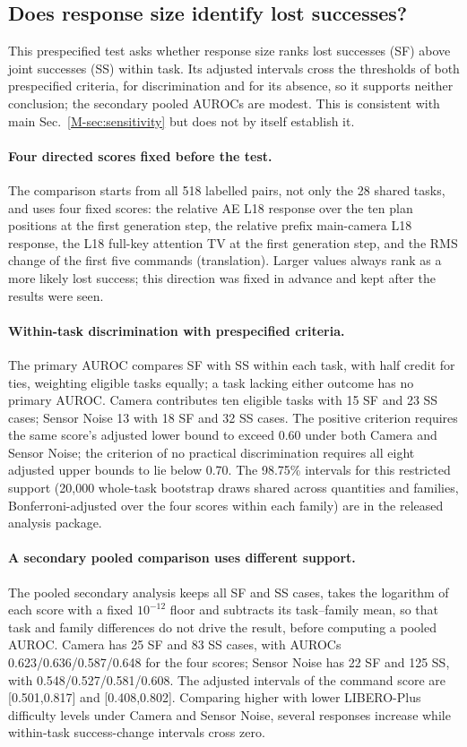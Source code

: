 \subsection{Does response size identify lost successes?}
\label{sec:plus-p0}
This prespecified test asks whether response size ranks lost successes (SF) above joint successes (SS) within task. Its adjusted intervals cross the thresholds of both prespecified criteria, for discrimination and for its absence, so it supports neither conclusion; the secondary pooled AUROCs are modest. This is consistent with main Sec.~\ref*{M-sec:sensitivity} but does not by itself establish it.

\paragraph{Four directed scores fixed before the test.}
The comparison starts from all 518 labelled pairs, not only the 28 shared tasks, and uses four fixed scores: the relative AE L18 response over the ten plan positions at the first generation step, the relative prefix main-camera L18 response, the L18 full-key attention TV at the first generation step, and the RMS change of the first five commands (translation). Larger values always rank as a more likely lost success; this direction was fixed in advance and kept after the results were seen.

\paragraph{Within-task discrimination with prespecified criteria.}
The primary AUROC compares SF with SS within each task, with half credit for ties, weighting eligible tasks equally; a task lacking either outcome has no primary AUROC. Camera contributes ten eligible tasks with 15 SF and 23 SS cases; Sensor Noise 13 with 18 SF and 32 SS cases. The positive criterion requires the same score's adjusted lower bound to exceed 0.60 under both Camera and Sensor Noise; the criterion of no practical discrimination requires all eight adjusted upper bounds to lie below 0.70. The 98.75\% intervals for this restricted support (20,000 whole-task bootstrap draws shared across quantities and families, Bonferroni-adjusted over the four scores within each family) are in the released analysis package.

\paragraph{A secondary pooled comparison uses different support.}
The pooled secondary analysis keeps all SF and SS cases, takes the logarithm of each score with a fixed $10^{-12}$ floor and subtracts its task--family mean, so that task and family differences do not drive the result, before computing a pooled AUROC. Camera has 25 SF and 83 SS cases, with AUROCs 0.623/0.636/0.587/0.648 for the four scores; Sensor Noise has 22 SF and 125 SS, with 0.548/0.527/0.581/0.608. The adjusted intervals of the command score are [0.501,0.817] and [0.408,0.802]. Comparing higher with lower LIBERO-Plus difficulty levels under Camera and Sensor Noise, several responses increase while within-task success-change intervals cross zero.
